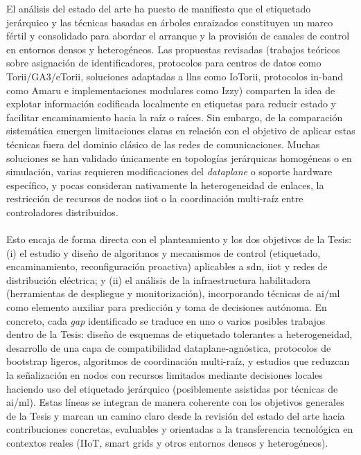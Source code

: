 El análisis del estado del arte ha puesto de manifiesto que el etiquetado jerárquico y las técnicas basadas en árboles enraizados constituyen un marco fértil y consolidado para abordar el arranque y la provisión de canales de control en entornos densos y heterogéneos. Las propuestas revisadas (trabajos teóricos sobre asignación de identificadores, protocolos para centros de datos como Torii/GA3/eTorii, soluciones adaptadas a \gls{llns} como IoTorii, protocolos in-band como Amaru e implementaciones modulares como Izzy) comparten la idea de explotar información codificada localmente en etiquetas para reducir estado y facilitar encaminamiento hacia la raíz o raíces. Sin embargo, de la comparación sistemática emergen limitaciones claras en relación con el objetivo de aplicar estas técnicas fuera del dominio clásico de las redes de comunicaciones. Muchas soluciones se han validado únicamente en topologías jerárquicas homogéneas o en simulación, varias requieren modificaciones del \textit{dataplane} o soporte hardware específico, y pocas consideran nativamente la heterogeneidad de enlaces, la restricción de recursos de nodos \gls{iiot} o la coordinación multi-raíz entre controladores distribuidos.\\
\\
Esto encaja de forma directa con el planteamiento y los dos objetivos de la Tesis: (i) el estudio y diseño de algoritmos y mecanismos de control (etiquetado, encaminamiento, reconfiguración proactiva) aplicables a \gls{sdn}, \gls{iiot} y redes de distribución eléctrica; y (ii) el análisis de la infraestructura habilitadora (herramientas de despliegue y monitorización), incorporando técnicas de \gls{ai}/\gls{ml} como elemento auxiliar para predicción y toma de decisiones autónoma. En concreto, cada \textit{gap} identificado se traduce en uno o varios posibles trabajos dentro de la Tesis: diseño de esquemas de etiquetado tolerantes a heterogeneidad, desarrollo de una capa de compatibilidad dataplane-agnóstica, protocolos de bootstrap ligeros, algoritmos de coordinación multi-raíz, y estudios que reduzcan la señalización en nodos con recursos limitados mediante decisiones locales haciendo uso del etiquetado jerárquico (posiblemente asistidas por técnicas de \gls{ai}/\gls{ml}). Estas líneas se integran de manera coherente con los objetivos generales de la Tesis y marcan un camino claro desde la revisión del estado del arte hacia contribuciones concretas, evaluables y orientadas a la transferencia tecnológica en contextos reales (IIoT, smart grids y otros entornos densos y heterogéneos).




